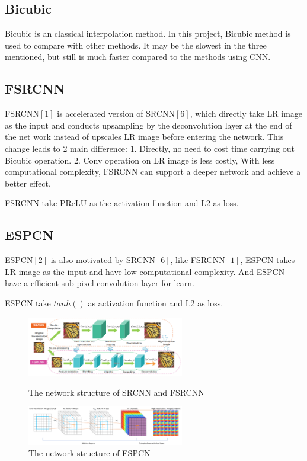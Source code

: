 \documentclass{article}
\begin{document}
  \subsection{Bicubic}
  Bicubic is an classical interpolation method. In this project, Bicubic method is used to compare with other methods.
  It may be the slowest in the three mentioned, but still is much faster compared to the methods using CNN.
  
  \subsection{FSRCNN} 
  FSRCNN$[1]$ is accelerated version of SRCNN$[6]$, 
  which directly take LR image as the input and conducts upsampling by the deconvolution layer at the end of the net work instead of upscales LR image before entering the network. 
  This change leads to 2 main difference: 1. Directly, no need to cost time carrying out Bicubic operation. 
  2. Conv operation on LR image is less costly, With less computational complexity, 
  FSRCNN can support a deeper network and achieve a better effect.
  
  FSRCNN take PReLU as the activation function and L2 as loss.


  \subsection{ESPCN}
  ESPCN$[2]$ is also motivated by SRCNN$[6]$, like FSRCNN$[1]$, 
  ESPCN takes LR image as the input and have low computational complexity. 
  And ESPCN have a efficient sub-pixel convolution layer for learn.
  
  ESPCN take $tanh()$ as activation function and L2 as loss.

  \begin{figure}[H]
    \begin{minipage}[H]{0.5\linewidth}
    \centering
    \includegraphics[width=2.7in]{images/FSRCNN.png}
    \caption{The network structure of SRCNN and FSRCNN}

    \end{minipage}
    \begin{minipage}[H]{0.5\linewidth}
    \centering
    \includegraphics[width=2.7in]{images/ESPCN.png}
    \caption{The network structure of ESPCN}

    \end{minipage}
\end{figure}
\end{document}
